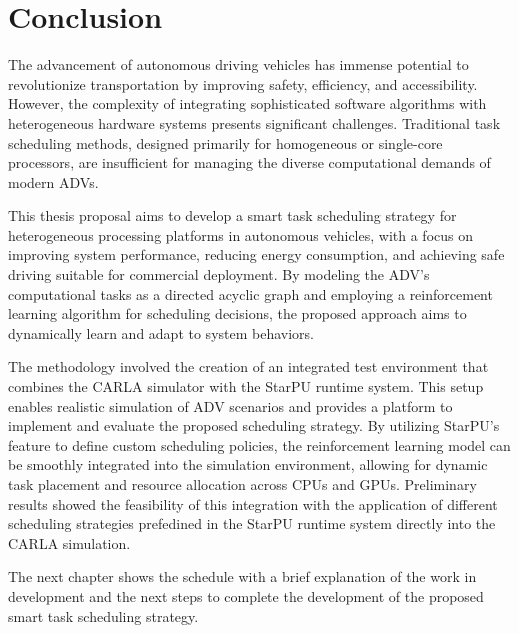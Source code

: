 \chapter{Conclusion} \label{conclusoes}
\vspace{-1.9cm}

The advancement of autonomous driving vehicles has immense potential to revolutionize transportation by improving safety, efficiency, and accessibility. However, the complexity of integrating sophisticated software algorithms with heterogeneous hardware systems presents significant challenges. Traditional task scheduling methods, designed primarily for homogeneous or single-core processors, are insufficient for managing the diverse computational demands of modern ADVs. 

This thesis proposal aims to develop a smart task scheduling strategy for heterogeneous processing platforms in autonomous vehicles, with a focus on improving system performance, reducing energy consumption, and achieving safe driving suitable for commercial deployment. By modeling the ADV's computational tasks as a directed acyclic graph and employing a reinforcement learning algorithm for scheduling decisions, the proposed approach aims to dynamically learn and adapt to system behaviors. 

The methodology involved the creation of an integrated test environment that combines the CARLA simulator with the StarPU runtime system. This setup enables realistic simulation of ADV scenarios and provides a platform to implement and evaluate the proposed scheduling strategy. By utilizing StarPU's feature to define custom scheduling policies, the reinforcement learning model can be smoothly integrated into the simulation environment, allowing for dynamic task placement and resource allocation across CPUs and GPUs. Preliminary results showed the feasibility of this integration with the application of different scheduling strategies prefedined in the StarPU runtime system directly into the CARLA simulation.

The next chapter shows the schedule with a brief explanation of the work in development and the next steps to complete the development of the proposed smart task scheduling strategy.

